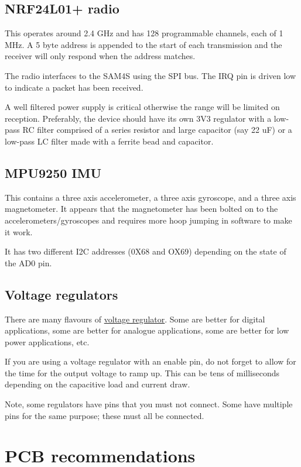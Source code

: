 \subsection{NRF24L01+ radio}\label{nrf24l01-radio}

This operates around 2.4 GHz and has 128 programmable channels, each of
1 MHz. A 5 byte address is appended to the start of each transmission
and the receiver will only respond when the address matches.

The radio interfaces to the SAM4S using the SPI bus. The IRQ
pin is driven low to indicate a packet has been received.

A well filtered power supply is critical otherwise the range will be
limited on reception. Preferably, the device should have its own 3V3
regulator with a low-pass RC filter comprised of a series resistor and
large capacitor (say 22 uF) or a low-pass LC filter made with a ferrite
bead and capacitor.

\subsection{MPU9250 IMU}\label{mpu9250-imu}

This contains a three axis accelerometer, a three axis gyroscope, and a
three axis magnetometer. It appears that the magnetometer has been
bolted on to the accelerometers/gyroscopes and requires more hoop
jumping in software to make it work.

It has two different I2C addresses (0X68 and OX69) depending on
the state of the AD0 pin.


\subsection{Voltage regulators}\label{voltage-regulators}

There are many flavours of \href{voltage_regulators}{voltage regulator}.
Some are better for digital applications, some are better for analogue
applications, some are better for low power applications, etc.

If you are using a voltage regulator with an enable pin, do not forget
to allow for the time for the output voltage to ramp up. This can be
tens of milliseconds depending on the capacitive load and current draw.

Note, some regulators have pins that you must not connect. Some have
multiple pins for the same purpose; these must all be connected.

\section{PCB recommendations}\label{pcb-recommendations}

